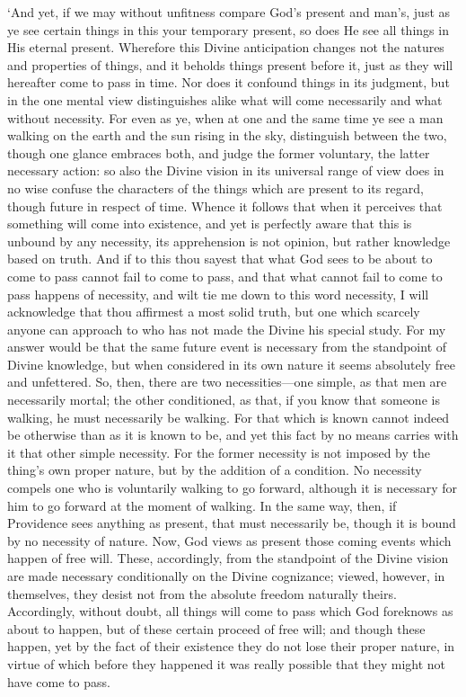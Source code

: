 \documentclass[12pt]{book}
\begin{document}
`And yet, if we may without unfitness compare God's present and man's,
just as ye see certain things in this your temporary present, so does He
see all things in His eternal present. Wherefore this Divine
anticipation changes not the natures and properties of things, and it
beholds things present before it, just as they will hereafter come to
pass in time. Nor does it confound things in its judgment, but in the
one mental view distinguishes alike what will come necessarily and what
without necessity. For even as ye, when at one and the same time ye see
a man walking on the earth and the sun rising in the sky, distinguish
between the two, though one glance embraces both, and judge the former
voluntary, the latter necessary action: so also the Divine vision in its
universal range of view does in no wise confuse the characters of the
things which are present to its regard, though future in respect of
time. Whence it follows that when it perceives that something will come
into existence, and yet is perfectly aware that this is unbound by any
necessity, its apprehension is not opinion, but rather knowledge based
on truth. And if to this thou sayest that what God sees to be about to
come to pass cannot fail to come to pass, and that what cannot fail to
come to pass happens of necessity, and wilt tie me down to this word
necessity, I will acknowledge that thou affirmest a most solid truth,
but one which scarcely anyone can approach to who has not made the
Divine his special study. For my answer would be that the same future
event is necessary from the standpoint of Divine knowledge, but when
considered in its own nature it seems absolutely free and unfettered.
So, then, there are two necessities---one simple, as that men are
necessarily mortal; the other conditioned, as that, if you know that
someone is walking, he must necessarily be walking. For that which is
known cannot indeed be otherwise than as it is known to be, and yet this
fact by no means carries with it that other simple necessity. For the
former necessity is not imposed by the thing's own proper nature, but by
the addition of a condition. No necessity compels one who is voluntarily
walking to go forward, although it is necessary for him to go forward at
the moment of walking. In the same way, then, if Providence sees
anything as present, that must necessarily be, though it is bound by no
necessity of nature. Now, God views as present those coming events which
happen of free will. These, accordingly, from the standpoint of the
Divine vision are made necessary conditionally on the Divine
cognizance; viewed, however, in themselves, they desist not from the
absolute freedom naturally theirs. Accordingly, without doubt, all
things will come to pass which God foreknows as about to happen, but of
these certain proceed of free will; and though these happen, yet by the
fact of their existence they do not lose their proper nature, in virtue
of which before they happened it was really possible that they might not
have come to pass.
\end{document}
